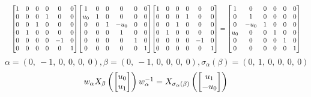 \documentclass[11pt]{article}
\theoremstyle{definition}
\begin{document}
\[
\scaletoalign{\textwidth}{{\left[\begin{matrix}1 & 0 & 0 & 0 & 0 & 0\\0 & 0 & 0 & 1 & 0 & 0\\0 & 0 & 1 & 0 & 0 & 0\\0 & 1 & 0 & 0 & 0 & 0\\0 & 0 & 0 & 0 & -1 & 0\\0 & 0 & 0 & 0 & 0 & 1\end{matrix}\right]} {\left[\begin{matrix}1 & 0 & 0 & 0 & 0 & 0\\u_{0} & 1 & 0 & 0 & 0 & 0\\0 & 0 & 1 & - u_{0} & 0 & 0\\0 & 0 & 0 & 1 & 0 & 0\\0 & 0 & 0 & 0 & 1 & 0\\0 & 0 & 0 & 0 & 0 & 1\end{matrix}\right]} {\left[\begin{matrix}1 & 0 & 0 & 0 & 0 & 0\\0 & 0 & 0 & 1 & 0 & 0\\0 & 0 & 1 & 0 & 0 & 0\\0 & 1 & 0 & 0 & 0 & 0\\0 & 0 & 0 & 0 & -1 & 0\\0 & 0 & 0 & 0 & 0 & 1\end{matrix}\right]} = {\left[\begin{matrix}1 & 0 & 0 & 0 & 0 & 0\\0 & 1 & 0 & 0 & 0 & 0\\0 & - u_{0} & 1 & 0 & 0 & 0\\u_{0} & 0 & 0 & 1 & 0 & 0\\0 & 0 & 0 & 0 & 1 & 0\\0 & 0 & 0 & 0 & 0 & 1\end{matrix}\right]}}
\]
\[
\alpha = \left( 0, \  -1, \  0, \  0, \  0, \  0\right), \beta = \left( 0, \  -1, \  0, \  0, \  0, \  0\right), \sigma_{\alpha}(\beta) = \left( 0, \  1, \  0, \  0, \  0, \  0\right)
\]
\[
\scaletoalign{\textwidth}{w_{\alpha} X_{\beta}\left(\left[\begin{matrix}u_{0}\\u_{1}\end{matrix}\right]\right) w_{\alpha}^{-1} = X_{\sigma_{\alpha}\left(\beta\right)}\left(\left[\begin{matrix}u_{1}\\- u_{0}\end{matrix}\right]\right)}
\]
\end{document}
